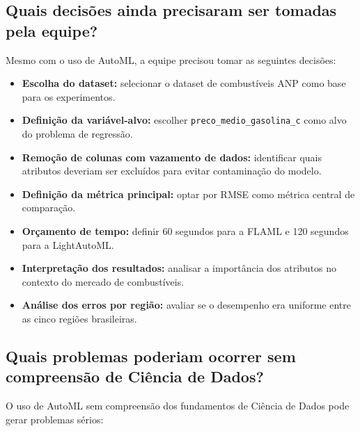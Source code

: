 \documentclass[11pt, a4paper, oneside]{article}
\begin{document}
\subsection{Quais decisões ainda precisaram ser tomadas pela equipe?}
\label{sec:decisoes-humanas}

Mesmo com o uso de AutoML, a equipe precisou tomar as seguintes decisões:

\begin{itemize}[leftmargin=1.5cm, itemsep=4pt]
  \item \textbf{Escolha do dataset:} selecionar o dataset de combustíveis ANP como base para os experimentos.
  \item \textbf{Definição da variável-alvo:} escolher \texttt{preco\_medio\_gasolina\_c} como alvo do problema de regressão.
  \item \textbf{Remoção de colunas com vazamento de dados:} identificar quais atributos deveriam ser excluídos para evitar contaminação do modelo.
  \item \textbf{Definição da métrica principal:} optar por RMSE como métrica central de comparação.
  \item \textbf{Orçamento de tempo:} definir 60 segundos para a FLAML e 120 segundos para a LightAutoML.
  \item \textbf{Interpretação dos resultados:} analisar a importância dos atributos no contexto do mercado de combustíveis.
  \item \textbf{Análise dos erros por região:} avaliar se o desempenho era uniforme entre as cinco regiões brasileiras.
\end{itemize}

\subsection{Quais problemas poderiam ocorrer sem compreensão de Ciência de Dados?}
\label{sec:riscos-sem-conhecimento}

O uso de AutoML sem compreensão dos fundamentos de Ciência de Dados pode gerar
problemas sérios:
\end{document}
